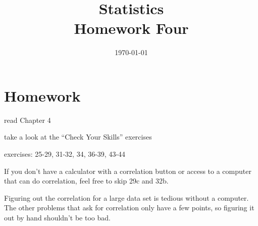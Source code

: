\documentclass{exam}
\title{Statistics \\ Homework Four}
\date{\today}
\author{}
\begin{document}
  \maketitle

  \section{Homework}
    \begin{itemize*}
      \item read Chapter 4 
      \item take a look at the ``Check Your Skills'' exercises
      \item exercises: 25-29, 31-32, 34, 36-39, 43-44
    \end{itemize*}

  \ifprintanswers
  \else

    If you don't have a calculator with a correlation button or access to a computer
    that can do correlation, feel free to skip 29c and 32b.  
    
    Figuring out the correlation for a large data set is tedious without a computer.
    The other problems that ask for correlation only have a few points, so figuring
    it out by hand shouldn't be too bad.

  \fi
\end{document}
